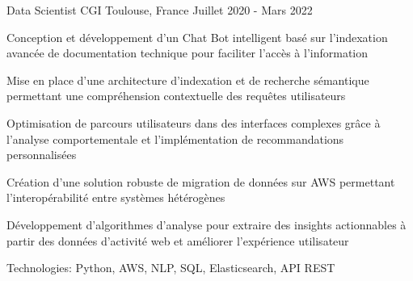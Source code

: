 \begin{cventries}
\cventry
{Data Scientist} %
{CGI} %
{Toulouse, France} %
{Juillet 2020 - Mars 2022} %
{ %
\begin{cvitems}
\item {Conception et développement d'un Chat Bot intelligent basé sur l'indexation avancée de documentation technique pour faciliter l'accès à l'information}
\item {Mise en place d'une architecture d'indexation et de recherche sémantique permettant une compréhension contextuelle des requêtes utilisateurs}
\item {Optimisation de parcours utilisateurs dans des interfaces complexes grâce à l'analyse comportementale et l'implémentation de recommandations personnalisées}
\item {Création d'une solution robuste de migration de données sur AWS permettant l'interopérabilité entre systèmes hétérogènes}
\item {Développement d'algorithmes d'analyse pour extraire des insights actionnables à partir des données d'activité web et améliorer l'expérience utilisateur}
\item {Technologies: Python, AWS, NLP, SQL, Elasticsearch, API REST}
\end{cvitems}
}
\vspace{1.5em}


\end{cventries}